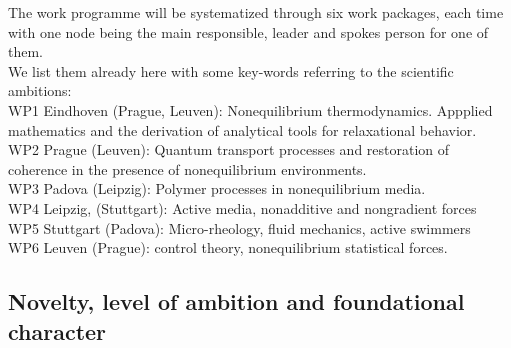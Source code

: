 The work programme will be systematized through six work packages, each time with one node being the main responsible, leader and spokes person for one of them.\\
We list them already here with some key-words referring to the scientific ambitions:\\
WP1 Eindhoven (Prague, Leuven): Nonequilibrium thermodynamics.  Appplied mathematics and the derivation of analytical tools for relaxational behavior.\\
WP2 Prague (Leuven): Quantum transport processes and restoration of coherence in the presence of nonequilibrium environments.\\
WP3 Padova (Leipzig): Polymer processes in nonequilibrium media.\\
WP4 Leipzig, (Stuttgart):  Active media, nonadditive and nongradient forces\\
WP5 Stuttgart (Padova): Micro-rheology, fluid mechanics, active swimmers\\
WP6 Leuven (Prague): control theory, nonequilibrium statistical forces.\\



\subsection{Novelty, level of ambition and foundational character}\label{sec:progress}


